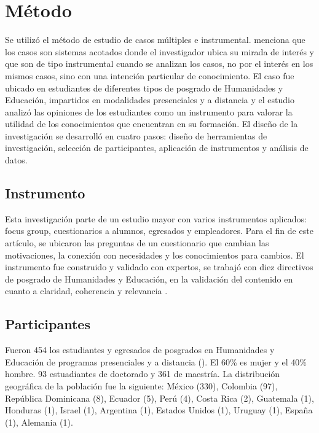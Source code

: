 \documentclass[spanish]{textolivre}
\begin{document}
\section{Método}\label{sec-modelo}
Se utilizó el método de estudio de casos múltiples e instrumental. \textcite{yin_case_2009} menciona que los casos son sistemas acotados donde el investigador ubica su mirada de interés y que son de tipo instrumental cuando se analizan los casos, no por el interés en los mismos casos, sino con una intención particular de conocimiento. El caso fue ubicado en estudiantes de diferentes tipos de posgrado de Humanidades y Educación, impartidos en modalidades presenciales y a distancia y el estudio analizó las opiniones de los estudiantes como un instrumento para valorar la utilidad de los conocimientos que encuentran en su formación. El diseño de la investigación se desarrolló en cuatro pasos: diseño de herramientas de investigación, selección de participantes, aplicación de instrumentos y análisis de datos.

\subsection{Instrumento}\label{sec-organizacao}
Esta investigación parte de un estudio mayor con varios instrumentos aplicados: focus group, cuestionarios a alumnos, egresados y empleadores. Para el fin de este artículo, se ubicaron las preguntas de un cuestionario que cambian las motivaciones, la conexión con necesidades y los conocimientos para cambios. El instrumento fue construido y validado con expertos, se trabajó con diez directivos de posgrado de Humanidades y Educación, en la validación del contenido en cuanto a claridad, coherencia y relevancia \cite{escobar2008}.

\subsection{Participantes}\label{sec-organizacao-latex}
Fueron 454 los estudiantes y egresados de posgrados en Humanidades y Educación de programas presenciales y a distancia (). El 60\% es mujer y el 40\% hombre. 93 estuadiantes de doctorado y 361 de maestría. La distribución geográfica de la población fue la siguiente: México (330), Colombia (97), República Dominicana (8), Ecuador (5), Perú (4), Costa Rica (2), Guatemala (1), Honduras (1), Israel (1), Argentina (1), Estados Unidos (1), Uruguay (1), España (1), Alemania (1).
\end{document}

